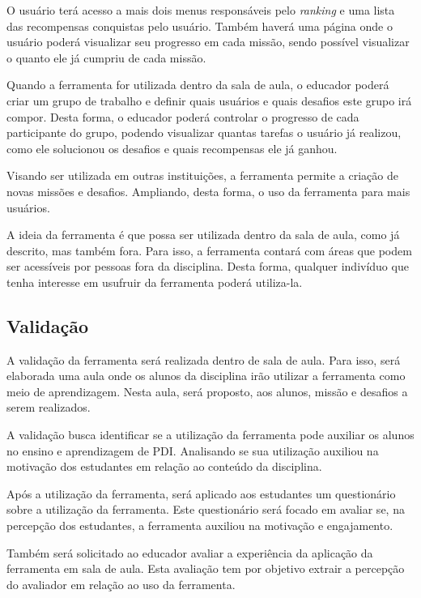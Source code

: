 \documentclass[
	12pt,				%
	oneside,			%
	a4paper,			%
	english,			%
	french,				%
	spanish,			%
	brazil,				%
	]{abntex2}
\begin{document}
O usuário terá acesso a mais dois menus responsáveis pelo \textit{ranking} e uma lista das recompensas conquistas pelo usuário. Também haverá uma página onde o usuário poderá visualizar seu progresso em cada missão, sendo possível visualizar o quanto ele já cumpriu de cada missão.

Quando a ferramenta for utilizada dentro da sala de aula, o educador poderá criar um grupo de trabalho e definir quais usuários e quais desafios este grupo irá compor. Desta forma, o educador poderá controlar o progresso de cada participante do grupo, podendo visualizar quantas tarefas o usuário já realizou, como ele solucionou os desafios e quais recompensas ele já ganhou.

Visando ser utilizada em outras instituições, a ferramenta permite a criação de novas missões e desafios. Ampliando, desta forma, o uso da ferramenta para mais usuários.

A ideia da ferramenta é que possa ser utilizada dentro da sala de aula, como já descrito, mas também fora. Para isso, a ferramenta contará com áreas que podem ser acessíveis por pessoas fora da disciplina. Desta forma, qualquer indivíduo que tenha interesse em usufruir da ferramenta poderá utiliza-la.

\subsection{Validação}

A validação da ferramenta será realizada dentro de sala de aula. Para isso, será elaborada uma aula onde os alunos da disciplina irão utilizar a ferramenta como meio de aprendizagem. Nesta aula, será proposto, aos alunos, missão e desafios a serem realizados.

A validação busca identificar se a utilização da ferramenta pode auxiliar os alunos no ensino e aprendizagem de PDI. Analisando se sua utilização auxiliou na motivação dos estudantes em relação ao conteúdo da disciplina.

Após a utilização da ferramenta, será aplicado aos estudantes um questionário sobre a utilização da ferramenta. Este questionário será focado em avaliar se, na percepção dos estudantes, a ferramenta auxiliou na motivação e engajamento.

Também será solicitado ao educador avaliar a experiência da aplicação da ferramenta em sala de aula. Esta avaliação tem por objetivo extrair a percepção do avaliador em relação ao uso da ferramenta.
\end{document}
